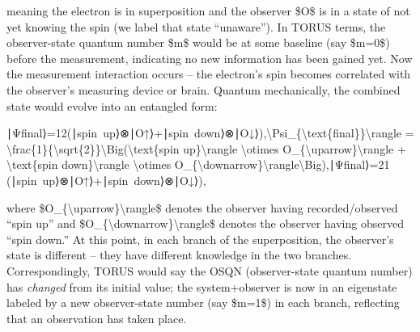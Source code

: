 \documentclass[]{article}
\begin{document}
meaning the electron is in superposition and the observer \$O\$ is in a
state of not yet knowing the spin (we label that state ``unaware'')​. In
TORUS terms, the observer-state quantum number \$m\$ would be at some
baseline (say \$m=0\$) before the measurement, indicating no new
information has been gained yet​. Now the measurement interaction occurs
-- the electron's spin becomes correlated with the observer's measuring
device or brain. Quantum mechanically, the combined state would evolve
into an entangled form:

∣Ψfinal⟩=12(∣spin~up⟩⊗∣O↑⟩+∣spin~down⟩⊗∣O↓⟩),\textbar{}\textbackslash{}Psi\_\{\textbackslash{}text\{final\}\}\textbackslash{}rangle
=
\textbackslash{}frac\{1\}\{\textbackslash{}sqrt\{2\}\}\textbackslash{}Big(\textbar{}\textbackslash{}text\{spin
up\}\textbackslash{}rangle \textbackslash{}otimes
\textbar{}O\_\{\textbackslash{}uparrow\}\textbackslash{}rangle +
\textbar{}\textbackslash{}text\{spin down\}\textbackslash{}rangle
\textbackslash{}otimes
\textbar{}O\_\{\textbackslash{}downarrow\}\textbackslash{}rangle\textbackslash{}Big),∣Ψfinal​⟩=2​1​(∣spin~up⟩⊗∣O↑​⟩+∣spin~down⟩⊗∣O↓​⟩),

where \$\textbar{}O\_\{\textbackslash{}uparrow\}\textbackslash{}rangle\$
denotes the observer having recorded/observed ``spin up'' and
\$\textbar{}O\_\{\textbackslash{}downarrow\}\textbackslash{}rangle\$
denotes the observer having observed ``spin down.'' At this point, in
each branch of the superposition, the observer's state is different --
they have different knowledge in the two branches​. Correspondingly,
TORUS would say the OSQN (observer-state quantum number) has
\emph{changed} from its initial value; the system+observer is now in an
eigenstate labeled by a new observer-state number (say \$m=1\$) in each
branch, reflecting that an observation has taken place​.
\end{document}

